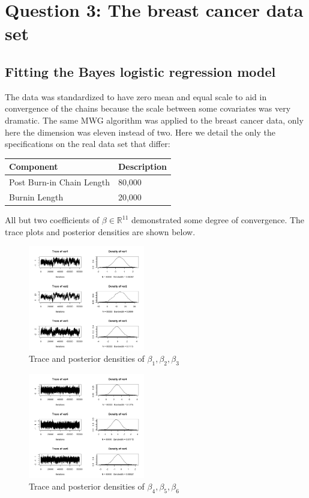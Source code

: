 \documentclass[11pt]{amsart}
\begin{document}
\section*{Question 3: The breast cancer data set}
\subsection*{Fitting the Bayes logistic regression model}
The data was standardized to have zero mean and equal scale to aid in convergence of the chains because the scale between some covariates was very dramatic. The same MWG algorithm was applied to the breast cancer data, only here the dimension was eleven instead of two. Here we detail the only the specifications on the real data set that differ:
 
\begin{tabular}{ll}
\hline
Component & Description \\
\hline
Post Burn-in Chain Length & 80,000 \\
Burnin Length & 20,000 \\
\end{tabular}

All but two coefficients of $\beta \in \mathbb{R}^11 $ demonstrated some degree of convergence. The trace plots and posterior densities are shown  below.

 \begin{figure}[htbp] %
   \centering
   \includegraphics[width=2in]{BayesLogit/real_trace_1_3.png} 
   \caption{Trace and posterior densities of $\beta_1, \beta_2, \beta_3$}
\end{figure}

 \begin{figure}[htbp] %
   \centering
   \includegraphics[width=2in]{BayesLogit/real_trace_4_6.png} 
   \caption{Trace and posterior densities of $\beta_4, \beta_5, \beta_6$}
\end{figure}
\end{document}
